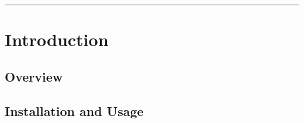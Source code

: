 \documentclass[letterpaper,twoside,openright,10pt]{memoir}
\begin{document}
\doparttoc

\frontmatter

\title{\FiPy{}}
\subtitle{User's Guide}


\author{Daniel Wheeler \andnext Jonathan E. Guyer \andnext James A. Warren}

\begin{titlingpage}
\maketitle
\thispagestyle{titlingpage}

\newpage

\vspace*{\fill}


\rule{\textwidth}{0.1pt}

\thispagestyle{empty}

\end{titlingpage}

\tableofcontents

\mainmatter


\part{Introduction}


\renewcommand{\ptctitle}{Introduction Contents}

\parttoc


\chapter{Overview}


  


\chapter{Installation and Usage}
\label{chap:Installation}
\end{document}
